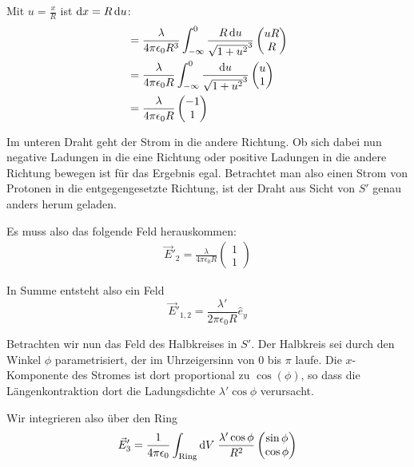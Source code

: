 \documentclass[a4paper,german,12pt,smallheadings]{scrartcl}
\begin{document}
Mit $u = \frac{x}{R}$ ist $\dif x = R \dif u$:
\begin{align*}
  &= \frac{\lambda}{4 \pi \epsilon_0 R^3} \int_{-\infty}^0
  \frac{R \dif u}{\sqrt{1 + u^2}^3} \begin{pmatrix} u R \\ R \end{pmatrix} \\
  &= \frac{\lambda}{4 \pi \epsilon_0 R} \int_{-\infty}^0
  \frac{\dif u}{\sqrt{1 + u^2}^3} \begin{pmatrix} u \\ 1 \end{pmatrix} \\
  &= \frac{\lambda}{4 \pi \epsilon_0 R} \begin{pmatrix} -1 \\ 1 \end{pmatrix}
\end{align*}

Im unteren Draht geht der Strom in die andere Richtung. Ob sich dabei nun
negative Ladungen in die eine Richtung oder positive Ladungen in die andere
Richtung bewegen ist für das Ergebnis egal. Betrachtet man also einen Strom von
Protonen in die entgegengesetzte Richtung, ist der Draht aus Sicht von $S'$
genau anders herum geladen.

Es muss also das folgende Feld herauskommen:
\begin{align*}
  \vec{E}'_2 = \frac{\lambda}{4 \pi \epsilon_0 R} \begin{pmatrix} 1 \\ 1 \end{pmatrix}
\end{align*}

In Summe entsteht also ein Feld
\begin{equation}
  \vec{E}'_{1,2} = \frac{\lambda'}{2 \pi \epsilon_0 R} \hat{e}_y
\end{equation}

Betrachten wir nun das Feld des Halbkreises in $S'$. Der Halbkreis sei durch
den Winkel $\phi$ parametrisiert, der im Uhrzeigersinn von $0$ bis $\pi$ laufe.
Die $x$-Komponente des Stromes ist dort proportional zu $\cos(\phi)$, so dass
die Längenkontraktion dort die Ladungsdichte $\lambda' \cos \phi$ verursacht.

Wir integrieren also über den Ring
\begin{equation}
  \vec{E}'_3 = \frac{1}{4 \pi \epsilon_0} \int_\text{Ring} \dif V \;
  \frac{\lambda' \cos \phi}{R^2} \begin{pmatrix} \sin \phi \\ \cos \phi \end{pmatrix}
\end{equation}
\end{document}
